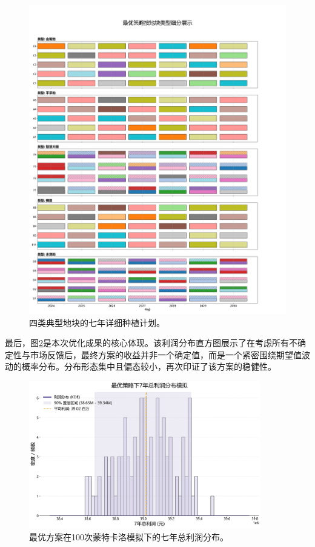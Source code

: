 \begin{figure}[H]
    \centering
    \includegraphics[width=\textwidth]{figs/5问题三/典型地块种植计划图.png}
    \caption{四类典型地块的七年详细种植计划。}
    \label{fig:plot_plan}
\end{figure}

最后，图\ref{fig:profit_dist}是本次优化成果的核心体现。该利润分布直方图展示了在考虑所有不确定性与市场反馈后，最终方案的收益并非一个确定值，而是一个紧密围绕期望值波动的概率分布。分布形态集中且偏态较小，再次印证了该方案的稳健性。

\begin{figure}[H]
    \centering
    \includegraphics[width=0.9\textwidth]{figs/5问题三/利润分布图.png}
    \caption{最优方案在100次蒙特卡洛模拟下的七年总利润分布。}
    \label{fig:profit_dist}
\end{figure}



